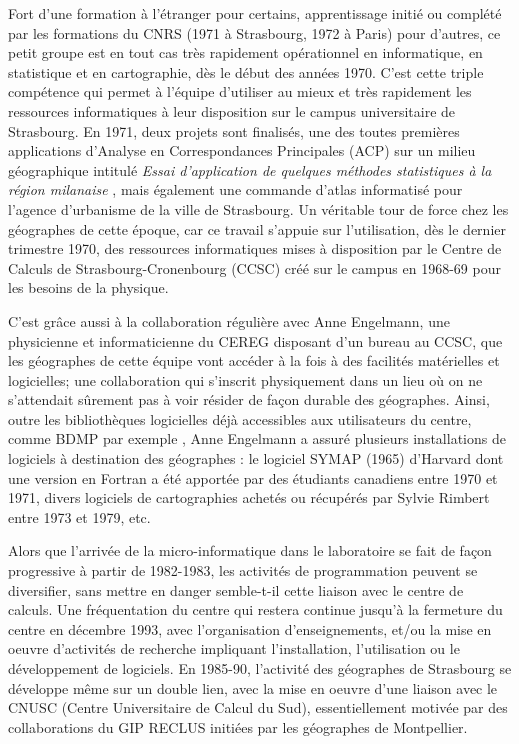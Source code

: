 Fort d'une formation à l'étranger pour certains, apprentissage initié ou complété par les formations du CNRS (1971 à Strasbourg, 1972 à Paris) pour d'autres, ce petit groupe est en tout cas très rapidement opérationnel en informatique, en statistique et en cartographie, dès le début des années 1970. C'est cette triple compétence qui permet à l'équipe d'utiliser au mieux et très rapidement les ressources informatiques à leur disposition sur le campus universitaire de Strasbourg. En 1971, deux projets sont finalisés, une des toutes premières applications d’Analyse en Correspondances Principales (ACP) sur un milieu géographique intitulé \textit{Essai d’application de quelques méthodes statistiques à la région milanaise} \autocite{Dalmasso1971}, mais également une commande d'atlas informatisé pour l'agence d'urbanisme de la ville de Strasbourg. Un véritable tour de force chez les géographes de cette époque, car ce travail s'appuie sur l'utilisation, dès le dernier trimestre 1970, des ressources informatiques mises à disposition par le Centre de Calculs de Strasbourg-Cronenbourg (CCSC) créé sur le campus en 1968-69 pour les besoins de la physique.

C'est grâce aussi à la collaboration régulière avec Anne Engelmann, une physicienne et informaticienne du CEREG disposant d'un bureau au CCSC, que les géographes de cette équipe vont accéder à la fois à des facilités matérielles  et logicielles; une collaboration qui s'inscrit physiquement dans un lieu où on ne s'attendait sûrement pas à voir résider de façon durable des géographes. Ainsi, outre les bibliothèques logicielles déjà accessibles aux utilisateurs du centre, comme BDMP par exemple , Anne Engelmann a assuré plusieurs installations de logiciels à destination des géographes : le logiciel SYMAP (1965) d'Harvard dont une version en Fortran a été apportée par des étudiants canadiens entre 1970 et 1971, divers logiciels de cartographies achetés ou récupérés par Sylvie Rimbert entre 1973 et 1979, etc.

Alors que l'arrivée de la micro-informatique dans le laboratoire se fait de façon progressive à partir de 1982-1983, les activités de programmation peuvent se diversifier, sans mettre en danger semble-t-il cette liaison avec le centre de calculs. Une fréquentation du centre qui restera continue jusqu'à la fermeture du centre en décembre 1993, avec l'organisation d'enseignements, et/ou la mise en oeuvre d'activités de recherche impliquant l'installation, l'utilisation ou le développement de logiciels. En 1985-90, l'activité des géographes de Strasbourg se développe même sur un double lien, avec la mise en oeuvre d'une liaison avec le CNUSC (Centre Universitaire de Calcul du Sud), essentiellement motivée par des collaborations du GIP RECLUS initiées par les géographes de Montpellier.

